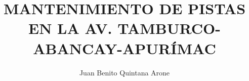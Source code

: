 \documentclass[spanish,12pt,a4paper,twoside,openany]{book}
\title{MANTENIMIENTO DE PISTAS EN LA AV. TAMBURCO-ABANCAY-APURÍMAC}
\author{Juan Benito Quintana Arone}
\begin{document}
\newcommand{\mytitulo}{MANTENIMIENTO DE PISTAS EN LA AV. TAMBURCO-ABANCAY-APURÍMAC}
\frontmatter





\newpage
\tableofcontents
\newpage
\listoftables
\newpage
\listoffigures
\newpage
\printglossary[type=\acronymtype, title={Siglas y Acrónimos}]
\mainmatter







\backmatter
\appendix

\printbibliography[title=BIBLIOGRAFÍA]
\end{document}

